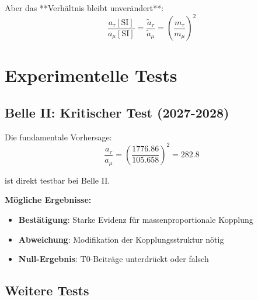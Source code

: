 	Aber das **Verhältnis bleibt unverändert**:
	\begin{equation}
		\frac{a_\tau[\text{SI}]}{a_\mu[\text{SI}]} = \frac{\tilde{a}_\tau}{\tilde{a}_\mu} = 
		\left(\frac{m_\tau}{m_\mu}\right)^2
	\end{equation}
	
	\section{Experimentelle Tests}
	
	\subsection{Belle II: Kritischer Test (2027-2028)}
	
	Die fundamentale Vorhersage:
	\begin{equation}
		\frac{a_\tau}{a_\mu} = \left(\frac{1776.86}{105.658}\right)^2 = 282.8
	\end{equation}
	
	ist direkt testbar bei Belle II.
	
	\textbf{Mögliche Ergebnisse:}
	\begin{itemize}
		\item \textbf{Bestätigung}: Starke Evidenz für massenproportionale Kopplung
		\item \textbf{Abweichung}: Modifikation der Kopplungsstruktur nötig
		\item \textbf{Null-Ergebnis}: T0-Beiträge unterdrückt oder falsch
	\end{itemize}
	
	\subsection{Weitere Tests}
	
	\begin{table}[h]
		\centering
		\caption{Experimentelle Tests der T0-Dirac-Formulierung}
	\end{table}
	
